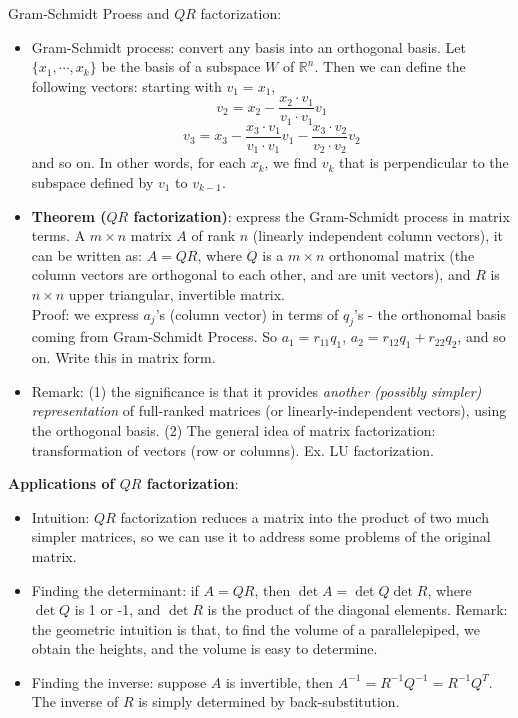 \documentclass{report}
\begin{document}
Gram-Schmidt Proess and $QR$ factorization: 
\begin{itemize}
\item Gram-Schmidt process: convert any basis into an orthogonal basis. Let $\{x_1, \cdots, x_k\}$ be the basis of a subspace $W$ of $\mathbb{R}^n$. Then we can define the following vectors: starting with $v_1 = x_1$,  
\begin{equation}
v_2 = x_2 - \frac{x_2 \cdot v_1}{v_1 \cdot v_1} v_1
\end{equation} 
\begin{equation}
v_3 = x_3 - \frac{x_3 \cdot v_1}{v_1 \cdot v_1} v_1 - \frac{x_3 \cdot v_2}{v_2 \cdot v_2} v_2
\end{equation} 
and so on. In other words, for each $x_k$, we find $v_k$ that is perpendicular to the subspace defined by $v_1$ to $v_{k-1}$. 

\item \textbf{Theorem ($QR$ factorization)}: express the Gram-Schmidt process in matrix terms. A $m \times n$ matrix $A$ of rank $n$ (linearly independent column vectors), it can be written as: $A = QR$, where $Q$ is a $m \times n$ orthonomal matrix (the column vectors are orthogonal to each other, and are unit vectors), and $R$ is $n \times n$ upper triangular, invertible matrix. \\
Proof: we express $a_j$'s (column vector) in terms of $q_j$'s - the orthonomal basis coming from Gram-Schmidt Process. So $a_1 = r_{11} q_1$, $a_2 = r_{12} q_1 + r_{22} q_2$, and so on. Write this in matrix form. 
	
\item Remark: (1) the significance is that it provides \textit{another (possibly simpler) representation} of full-ranked matrices (or linearly-independent vectors), using the orthogonal basis. (2) The general idea of matrix factorization: transformation of vectors (row or columns). Ex. LU factorization. 
 
\end{itemize}

\textbf{Applications of $QR$ factorization}: 
\begin{itemize}
	\item Intuition: $QR$ factorization reduces a matrix into the product of two much simpler matrices, so we can use it to address some problems of the original matrix. 
	
	\item Finding the determinant: if $A = QR$, then $\det A = \det Q \det R$, where $\det Q$ is 1 or -1, and $\det R$ is the product of the diagonal elements. Remark: the geometric intuition is that, to find the volume of a parallelepiped, we obtain the heights, and the volume is easy to determine. 
	
	\item Finding the inverse: suppose $A$ is invertible, then $A^{-1} = R^{-1} Q^{-1} = R^{-1} Q^T$. The inverse of $R$ is simply determined by back-substitution.   
\end{itemize}
\end{document}
